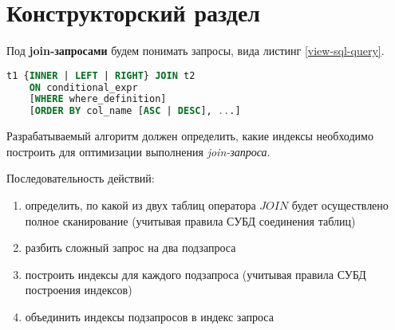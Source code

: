 \chapter{Конструкторский раздел}

Под \textbf{join-запросами} будем понимать запросы, вида листинг \ref{view-sql-query}.

\begin{lstlisting}[language=sql, caption={Вид sql запроса},label=view-sql-query]
t1 {INNER | LEFT | RIGHT} JOIN t2
    ON conditional_expr
    [WHERE where_definition]
    [ORDER BY col_name [ASC | DESC], ...]
\end{lstlisting}

Разрабатываемый алгоритм должен определить, какие индексы необ­ходимо построить для оптимизации выполнения \textit{join-запроса}.

Последовательность действий:
\begin{enumerate}
\item определить, по какой из двух таблиц оператора $JOIN$ будет осу­ществлено полное сканирование (учитывая правила СУБД соединения таблиц)
\item разбить сложный запрос на два подзапроса
\item построить индексы для каждого подзапроса (учитывая правила СУБД построения индексов)
\item объединить индексы подзапросов в индекс запроса
\end{enumerate}



